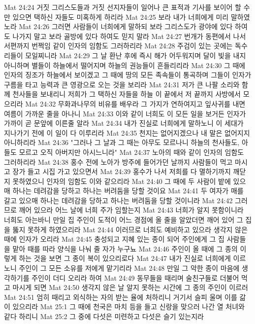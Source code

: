 Mat 24:24  거짓 그리스도들과 거짓 선지자들이 일어나 큰 표적과 기사를 보이어 할 수만 있으면 택하신 자들도 미혹하게 하리라
Mat 24:25  보라 내가 너희에게 미리 말하였노라
Mat 24:26  그러면 사람들이 너희에게 말하되 보라 그리스도가 광야에 있다 하여도 나가지 말고 보라 골방에 있다 하여도 믿지 말라
Mat 24:27  번개가 동편에서 나서 서편까지 번쩍임 같이 인자의 임함도 그러하리라
Mat 24:28  주검이 있는 곳에는 독수리들이 모일찌니라
Mat 24:29  그 날 환난 후에 즉시 해가 어두워지며 달이 빛을 내지 아니하며 별들이 하늘에서 떨어지며 하늘의 권능들이 흔들리리라
Mat 24:30  그 때에 인자의 징조가 하늘에서 보이겠고 그 때에 땅의 모든 족속들이 통곡하며 그들이 인자가 구름을 타고 능력과 큰 영광으로 오는 것을 보리라
Mat 24:31  저가 큰 나팔 소리와 함께 천사들을 보내리니 저희가 그 택하신 자들을 하늘 이 끝에서 저 끝까지 사방에서 모으리라
Mat 24:32  무화과나무의 비유를 배우라 그 가지가 연하여지고 잎사귀를 내면 여름이 가까운 줄을 아나니
Mat 24:33  이와 같이 너희도 이 모든 일을 보거든 인자가 가까이 곧 문앞에 이른줄 알라
Mat 24:34  내가 진실로 너희에게 말하노니 이 세대가 지나가기 전에 이 일이 다 이루리라
Mat 24:35  천지는 없어지겠으나 내 말은 없어지지 아니하리라
Mat 24:36  "그러나 그 날과 그 때는 아무도 모르나니 하늘의 천사들도, 아들도 모르고 오직 아버지만 아시느니라"
Mat 24:37  노아의 때와 같이 인자의 임함도 그러하리라
Mat 24:38  홍수 전에 노아가 방주에 들어가던 날까지 사람들이 먹고 마시고 장가 들고 시집 가고 있으면서
Mat 24:39  홍수가 나서 저희를 다 멸하기까지 깨닫지 못하였으니 인자의 임함도 이와 같으리라
Mat 24:40  그 때에 두 사람이 밭에 있으매 하나는 데려감을 당하고 하나는 버려둠을 당할 것이요
Mat 24:41  두 여자가 매를 갈고 있으매 하나는 데려감을 당하고 하나는 버려둠을 당할 것이니라
Mat 24:42  그러므로 깨어 있으라 어느 날에 너희 주가 임할는지
Mat 24:43  너희가 알지 못함이니라 너희도 아는바니 만일 집 주인이 도적이 어느 경점에 올 줄을 알았더면 깨어 있어 그 집을 뚫지 못하게 하였으리라
Mat 24:44  이러므로 너희도 예비하고 있으라 생각지 않은 때에 인자가 오리라
Mat 24:45  충성되고 지혜 있는 종이 되어 주인에게 그 집 사람들을 맡아 때를 따라 양식을 나눠 줄 자가 누구뇨
Mat 24:46  주인이 올 때에 그 종의 이렇게 하는 것을 보면 그 종이 복이 있으리로다
Mat 24:47  내가 진실로 너희에게 이르노니 주인이 그 모든 소유를 저에게 맡기리라
Mat 24:48  만일 그 악한 종이 마음에 생각하기를 주인이 더디 오리라 하여
Mat 24:49  동무들을 때리며 술친구들로 더불어 먹고 마시게 되면
Mat 24:50  생각지 않은 날 알지 못하는 시간에 그 종의 주인이 이르러
Mat 24:51  엄히 때리고 외식하는 자의 받는 율에 처하리니 거기서 슬피 울며 이를 갊이 있으리라
Mat 25:1  그 때에 천국은 마치 등을 들고 신랑을 맞으러 나간 열 처녀와 같다 하리니
Mat 25:2  그 중에 다섯은 미련하고 다섯은 슬기 있는지라
